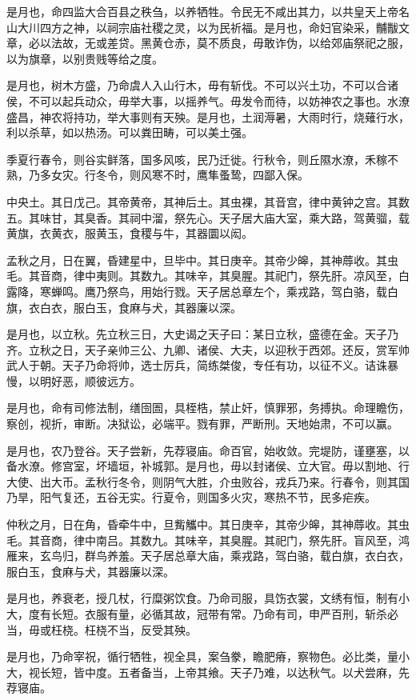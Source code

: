 \documentclass[]{article}
\begin{document}
是月也，命四监大合百县之秩刍，以养牺牲。令民无不咸出其力，以共皇天上帝名山大川四方之神，以祠宗庙社稷之灵，以为民祈福。是月也，命妇官染采，黼黻文章，必以法故，无或差贷。黑黄仓赤，莫不质良，毋敢诈伪，以给郊庙祭祀之服，以为旗章，以别贵贱等给之度。

是月也，树木方盛，乃命虞人入山行木，毋有斩伐。不可以兴土功，不可以合诸侯，不可以起兵动众，毋举大事，以摇养气。毋发令而待，以妨神农之事也。水潦盛昌，神农将持功，举大事则有天殃。是月也，土润溽暑，大雨时行，烧薙行水，利以杀草，如以热汤。可以粪田畴，可以美土强。

季夏行春令，则谷实鲜落，国多风咳，民乃迁徙。行秋令，则丘隰水潦，禾稼不熟，乃多女灾。行冬令，则风寒不时，鹰隼蚤鸷，四鄙入保。

中央土。其日戊己。其帝黄帝，其神后土。其虫裸，其音宫，律中黄钟之宫。其数五。其味甘，其臭香。其祠中溜，祭先心。天子居大庙大室，乘大路，驾黄骝，载黄旗，衣黄衣，服黄玉，食稷与牛，其器圜以闳。

孟秋之月，日在翼，昏建星中，旦毕中。其日庚辛。其帝少皞，其神蓐收。其虫毛。其音商，律中夷则。其数九。其味辛，其臭腥。其祀门，祭先肝。凉风至，白露降，寒蝉鸣。鹰乃祭鸟，用始行戮。天子居总章左个，乘戎路，驾白骆，载白旗，衣白衣，服白玉，食麻与犬，其器廉以深。

是月也，以立秋。先立秋三日，大史谒之天子曰：某日立秋，盛德在金。天子乃齐。立秋之日，天子亲帅三公、九卿、诸侯、大夫，以迎秋于西郊。还反，赏军帅武人于朝。天子乃命将帅，选士厉兵，简练桀俊，专任有功，以征不义。诘诛暴慢，以明好恶，顺彼远方。

是月也，命有司修法制，缮囹圄，具桎梏，禁止奸，慎罪邪，务搏执。命理瞻伤，察创，视折，审断。决狱讼，必端平。戮有罪，严断刑。天地始肃，不可以赢。

是月也，农乃登谷。天子尝新，先荐寝庙。命百官，始收敛。完堤防，谨壅塞，以备水潦。修宫室，坏墙垣，补城郭。是月也，毋以封诸侯、立大官。毋以割地、行大使、出大币。孟秋行冬令，则阴气大胜，介虫败谷，戎兵乃来。行春令，则其国乃旱，阳气复还，五谷无实。行夏令，则国多火灾，寒热不节，民多疟疾。

仲秋之月，日在角，昏牵牛中，旦觜觿中。其日庚辛，其帝少皞，其神蓐收。其虫毛。其音商，律中南吕。其数九。其味辛，其臭腥。其祀门，祭先肝。盲风至，鸿雁来，玄鸟归，群鸟养羞。天子居总章大庙，乘戎路，驾白骆，载白旗，衣白衣，服白玉，食麻与犬，其器廉以深。

是月也，养衰老，授几杖，行糜粥饮食。乃命司服，具饬衣裳，文绣有恒，制有小大，度有长短。衣服有量，必循其故，冠带有常。乃命有司，申严百刑，斩杀必当，毋或枉桡。枉桡不当，反受其殃。

是月也，乃命宰祝，循行牺牲，视全具，案刍豢，瞻肥瘠，察物色。必比类，量小大，视长短，皆中度。五者备当，上帝其飨。天子乃难，以达秋气。以犬尝麻，先荐寝庙。
\end{document}
